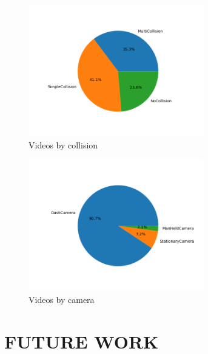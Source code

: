 \documentclass[letterpaper, 10 pt, conference]{IEEEconf}
\newcommand{\todo}[1]{{\color{red}#1}}
\begin{document}
\begin{figure}[htpb]
		\centering
    \includegraphics[width=3in]{by-collision.png}
		\caption{Videos by collision}
		\label{fig:vids-by-collision}
\end{figure}

\begin{figure}[htpb]
		\centering
    \includegraphics[width=3in]{by-camera.png}
		\caption{Videos by camera}
		\label{fig:vids-by-camera}
\end{figure}



\section{FUTURE WORK}
\end{document}
